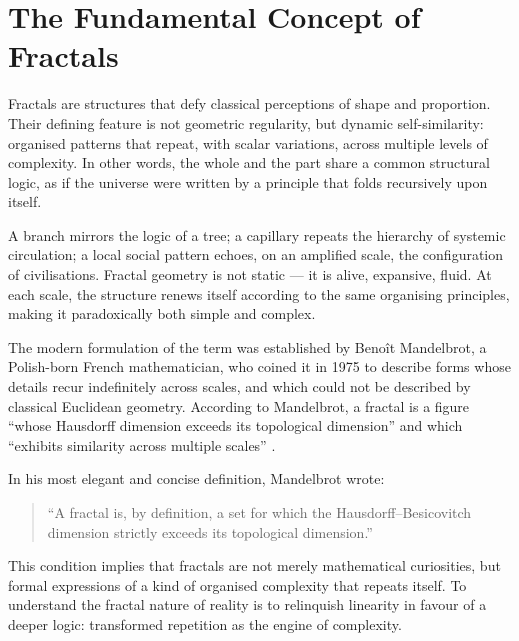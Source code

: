 \section{The Fundamental Concept of Fractals}

Fractals are structures that defy classical perceptions of shape and proportion. Their defining feature is not geometric regularity, but dynamic self-similarity: organised patterns that repeat, with scalar variations, across multiple levels of complexity. In other words, the whole and the part share a common structural logic, as if the universe were written by a principle that folds recursively upon itself.

A branch mirrors the logic of a tree; a capillary repeats the hierarchy of systemic circulation; a local social pattern echoes, on an amplified scale, the configuration of civilisations. Fractal geometry is not static — it is alive, expansive, fluid. At each scale, the structure renews itself according to the same organising principles, making it paradoxically both simple and complex.

The modern formulation of the term was established by Benoît Mandelbrot, a Polish-born French mathematician, who coined it in 1975 to describe forms whose details recur indefinitely across scales, and which could not be described by classical Euclidean geometry. According to Mandelbrot, a fractal is a figure “whose Hausdorff dimension exceeds its topological dimension” and which “exhibits similarity across multiple scales” \cite{mandelbrot1982}.

In his most elegant and concise definition, Mandelbrot wrote:

\begin{quote}
“A fractal is, by definition, a set for which the Hausdorff–Besicovitch dimension strictly exceeds its topological dimension.” \cite{mandelbrot1982}
\end{quote}

This condition implies that fractals are not merely mathematical curiosities, but formal expressions of a kind of organised complexity that repeats itself. To understand the fractal nature of reality is to relinquish linearity in favour of a deeper logic: transformed repetition as the engine of complexity.
